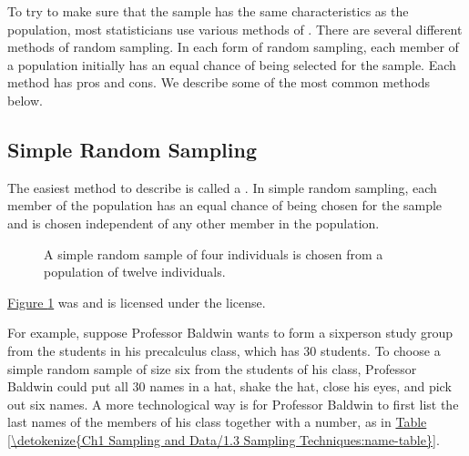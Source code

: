 \documentclass[letterpaper,10pt,english]{jupyterBook}
\begin{document}
\sphinxAtStartPar
To try to make sure that the sample has the same characteristics as the population, most statisticians use various methods of . There are several different methods of random sampling. In each form of random sampling, each member of a population initially has an equal chance of being selected for the sample. Each method has pros and cons. We describe some of the most common methods below.


\subsection{Simple Random Sampling}
\label{\detokenize{Ch1 Sampling and Data/1.3 Sampling Techniques:simple-random-sampling}}
\sphinxAtStartPar
The easiest method to describe is called a . In simple random sampling, each member of the population has an equal chance of being chosen for the sample and is chosen independent of any other member in the population.

\begin{figure}[htbp]
\centering
\capstart

\noindent{}
\caption{A simple random sample of four individuals is chosen from a population of twelve individuals.\sphinxfootnotemark[1]}\label{\detokenize{Ch1 Sampling and Data/1.3 Sampling Techniques:id2}}\end{figure}
%
\begin{footnotetext}[1]\sphinxAtStartFootnote
\hyperref[\detokenize{Ch1 Sampling and Data/1.3 Sampling Techniques:id2}]{Figure \ref{\detokenize{Ch1 Sampling and Data/1.3 Sampling Techniques:id2}}} was  and is licensed under the  license.
%
\end{footnotetext}\ignorespaces 
\sphinxAtStartPar
For example, suppose Professor Baldwin wants to form a six\sphinxhyphen{}person study group from the students in his precalculus class, which has 30 students. To choose a simple random sample of size six from the students of his class, Professor Baldwin could put all 30 names in a hat, shake the hat, close his eyes, and pick out six names. A more technological way is for Professor Baldwin to first list the last names of the members of his class together with a number, as in \hyperref[\detokenize{Ch1 Sampling and Data/1.3 Sampling Techniques:name-table}]{Table \ref{\detokenize{Ch1 Sampling and Data/1.3 Sampling Techniques:name-table}}}.
\end{document}

